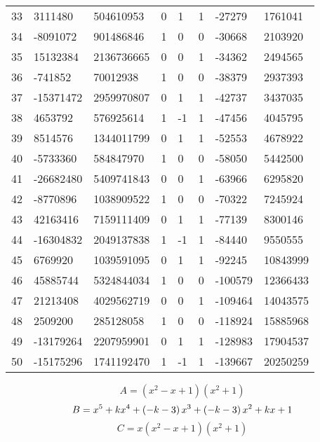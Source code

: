 \documentclass{amsart}
\begin{document}
\begin{longtable}{|l|l|l|lllll|}
33&3111480&504610953&0&1&1&-27279&1761041\\
34&-8091072&901486846&1&0&0&-30668&2103920\\
35&15132384&2136736665&0&0&1&-34362&2494565\\
36&-741852&70012938&1&0&0&-38379&2937393\\
37&-15371472&2959970807&0&1&1&-42737&3437035\\
38&4653792&576925614&1&-1&1&-47456&4045795\\
39&8514576&1344011799&0&1&1&-52553&4678922\\
40&-5733360&584847970&1&0&0&-58050&5442500\\
41&-26682480&5409741843&0&0&1&-63966&6295820\\
42&-8770896&1038909522&1&0&0&-70322&7245924\\
43&42163416&7159111409&0&1&1&-77139&8300146\\
44&-16304832&2049137838&1&-1&1&-84440&9550555\\
45&6769920&1039591095&0&1&1&-92245&10843999\\
46&45885744&5324844034&1&0&0&-100579&12366433\\
47&21213408&4029562719&0&0&1&-109464&14043575\\
48&2509200&285128058&1&0&0&-118924&15885968\\
49&-13179264&2207959901&0&1&1&-128983&17904537\\
50&-15175296&1741192470&1&-1&1&-139667&20250259\\
\hline
\end{longtable}
$$A=(x^2
 - x
 + 1)(x^2
 + 1)$$
$$B=x^5
 + k\*x^4
 + \left(-k
 - 3\right) \*x^3
 + \left(-k
 - 3\right) \*x^2
 + k\*x
 + 1$$
$$C=x(x^2
 - x
 + 1)(x^2
 + 1)$$
\end{document}
